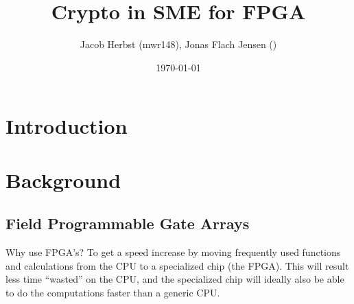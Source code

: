 \documentclass[a4paper]{article}
\author{Jacob Herbst (mwr148), Jonas Flach Jensen ()}
\date{\today}
\title{Crypto in SME for FPGA}
\begin{document}
\maketitle
\tableofcontents

\newpage
\section{Introduction}
\label{sec:orgf8a729f}

\section{Background}
\label{sec:orga55678d}

\subsection{Field Programmable Gate Arrays}
\label{sec:org4760699}

Why use FPGA's? To get a speed increase by moving frequently used functions and calculations from the CPU to a specialized chip (the FPGA).
This will result less time ``wasted'' on the CPU, and the specialized chip will ideally also be able to do the computations faster than a generic CPU.
\end{document}
